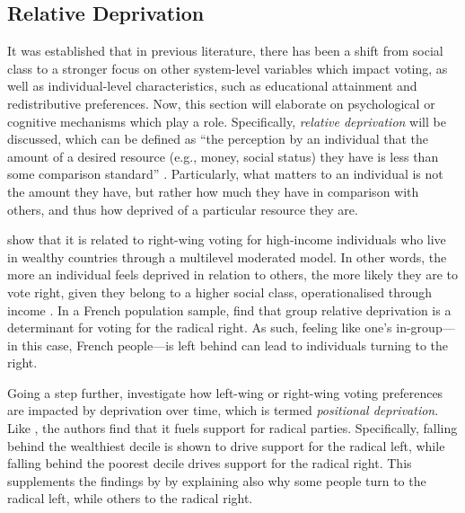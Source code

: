 \documentclass[stu,12pt]{apa7}
\begin{document}
\subsection{Relative Deprivation}

It was established that in previous literature, there has been a shift from social class to a stronger focus on other system-level variables which impact voting, as well as individual-level characteristics, such as educational attainment and redistributive preferences. Now, this section will elaborate on psychological or cognitive mechanisms which play a role. Specifically, \textit{relative deprivation} will be discussed, which can be defined as “the perception by an individual that the amount of a desired resource (e.g., money, social status) they have is less than some comparison standard” \parencite{Relative_deprivation}. Particularly, what matters to an individual is not the amount they have, but rather how much they have in comparison with others, and thus how deprived of a particular resource they are.

\textcite{cenaRelativeDeprivationNational2023} show that it is related to right-wing voting for high-income individuals who live in wealthy countries through a multilevel moderated model. In other words, the more an individual feels deprived in relation to others, the more likely they are to vote right, given they belong to a higher social class, operationalised through income \parencite{cenaRelativeDeprivationNational2023}. In a French population sample, \textcite{urbanskaSwayingExtremeGroup2018} find that group relative deprivation is a determinant for voting for the radical right. As such, feeling like one’s in-group—in this case, French people—is left behind can lead to individuals turning to the right.

Going a step further, \textcite{burgoonPositionalDeprivationSupport2019} investigate how left-wing or right-wing voting preferences are impacted by deprivation over time, which is termed \textit{positional deprivation}. Like \textcite{cenaRelativeDeprivationNational2023}, the authors find that it fuels support for radical parties. Specifically, falling behind the wealthiest decile is shown to drive support for the radical left, while falling behind the poorest decile drives support for the radical right. This supplements the findings by \textcite{urbanskaSwayingExtremeGroup2018} by explaining also why some people turn to the radical left, while others to the radical right.
\end{document}
